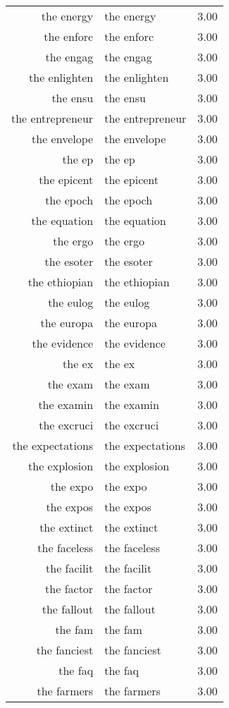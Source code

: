 \begin{table}[ht]
\begin{tabular}{rlr}
  the energy & the energy & 3.00 \\ 
  the enforc & the enforc & 3.00 \\ 
  the engag & the engag & 3.00 \\ 
  the enlighten & the enlighten & 3.00 \\ 
  the ensu & the ensu & 3.00 \\ 
  the entrepreneur & the entrepreneur & 3.00 \\ 
  the envelope & the envelope & 3.00 \\ 
  the ep & the ep & 3.00 \\ 
  the epicent & the epicent & 3.00 \\ 
  the epoch & the epoch & 3.00 \\ 
  the equation & the equation & 3.00 \\ 
  the ergo & the ergo & 3.00 \\ 
  the esoter & the esoter & 3.00 \\ 
  the ethiopian & the ethiopian & 3.00 \\ 
  the eulog & the eulog & 3.00 \\ 
  the europa & the europa & 3.00 \\ 
  the evidence & the evidence & 3.00 \\ 
  the ex & the ex & 3.00 \\ 
  the exam & the exam & 3.00 \\ 
  the examin & the examin & 3.00 \\ 
  the excruci & the excruci & 3.00 \\ 
  the expectations & the expectations & 3.00 \\ 
  the explosion & the explosion & 3.00 \\ 
  the expo & the expo & 3.00 \\ 
  the expos & the expos & 3.00 \\ 
  the extinct & the extinct & 3.00 \\ 
  the faceless & the faceless & 3.00 \\ 
  the facilit & the facilit & 3.00 \\ 
  the factor & the factor & 3.00 \\ 
  the fallout & the fallout & 3.00 \\ 
  the fam & the fam & 3.00 \\ 
  the fanciest & the fanciest & 3.00 \\ 
  the faq & the faq & 3.00 \\ 
  the farmers & the farmers & 3.00 \\ 

\end{tabular}
\end{table}
